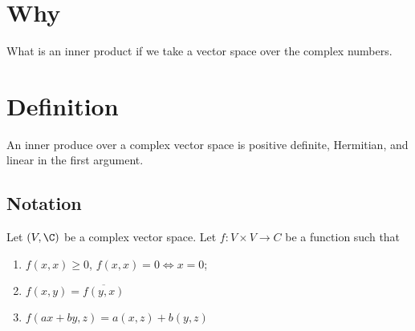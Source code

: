 
\section*{Why}

What is an inner product if we take a vector space over the complex numbers.

\section*{Definition}

An inner produce over a complex vector space is positive definite, Hermitian, and linear in the first argument.

\subsection*{Notation}

Let $(V, \C )$ be a complex vector space.
Let $f: V \times V \to C$ be a function such that
    \begin{enumerate}
      \item $f(x, x) \geq 0$, $f(x, x) = 0 \Leftrightarrow x = 0$;
      \item $f(x, y) = \overline{f(y, x)}$
      \item $f(ax + by, z) = a(x, z) + b(y, z)$
    \end{enumerate}
